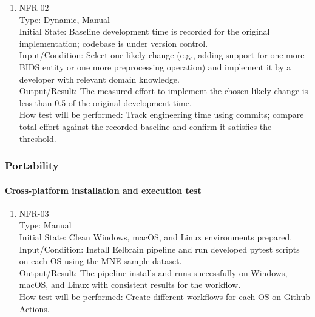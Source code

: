 \documentclass[12pt, titlepage]{article}
\begin{document}
\begin{enumerate}


\item{NFR-02\\}
    Type: Dynamic, Manual \\
    Initial State: Baseline development time is recorded for the original implementation; codebase is under version control. \\
    Input/Condition: Select one likely change (e.g., adding support for one more BIDS entity or one more preprocessing operation) and implement it by a developer with relevant domain knowledge. \\
    Output/Result: The measured effort to implement the chosen likely change is less than 0.5 of the original development time. \\
    How test will be performed: Track engineering time using commits; compare total effort against the recorded baseline and confirm it satisfies the threshold.


\end{enumerate}


\subsubsection{Portability}


\paragraph{Cross-platform installation and execution test}


\begin{enumerate}


\item{NFR-03\\}
    Type: Manual \\		
    Initial State: Clean Windows, macOS, and Linux environments prepared. \\
    Input/Condition: Install Eelbrain pipeline and run developed pytest scripts on each OS using the MNE sample dataset. \\
    Output/Result: The pipeline installs and runs successfully on Windows, macOS, and Linux with consistent results for the workflow. \\
    How test will be performed: Create different workflows for each OS on Github Actions.


\end{enumerate}
\end{document}
